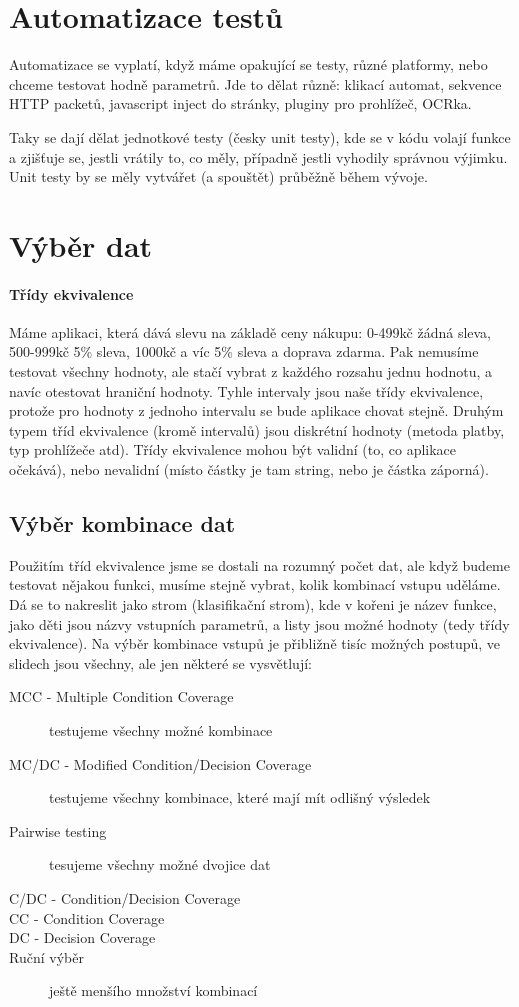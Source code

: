 \section{Automatizace testů}

Automatizace se vyplatí, když máme opakující se testy, různé platformy, nebo chceme testovat hodně parametrů. Jde to dělat různě: klikací automat, sekvence HTTP packetů, javascript inject do stránky, pluginy pro prohlížeč, OCRka.

Taky se dají dělat jednotkové testy (česky unit testy), kde se v kódu volají funkce a zjišťuje se, jestli vrátily to, co měly, případně jestli vyhodily správnou výjimku. Unit testy by se měly vytvářet (a spouštět) průběžně během vývoje.


\section{Výběr dat}

\paragraph{Třídy ekvivalence} Máme aplikaci, která dává slevu na základě ceny nákupu: 0-499kč žádná sleva, 500-999kč 5\% sleva, 1000kč a víc 5\% sleva a doprava zdarma. Pak nemusíme testovat všechny hodnoty, ale stačí vybrat z každého rozsahu jednu hodnotu, a navíc otestovat hraniční hodnoty. Tyhle intervaly jsou naše třídy ekvivalence, protože pro hodnoty z jednoho intervalu se bude aplikace chovat stejně. Druhým typem tříd ekvivalence (kromě intervalů) jsou diskrétní hodnoty (metoda platby, typ prohlížeče atd). Třídy ekvivalence mohou být validní (to, co aplikace očekává), nebo nevalidní (místo částky je tam string, nebo je částka záporná).

\subsection{Výběr kombinace dat} Použitím tříd ekvivalence jsme se dostali na rozumný počet dat, ale když budeme testovat nějakou funkci, musíme stejně vybrat, kolik kombinací vstupu uděláme. Dá se to nakreslit jako strom (klasifikační strom), kde v kořeni je název funkce, jako děti jsou názvy vstupních parametrů, a listy jsou možné hodnoty (tedy třídy ekvivalence). Na výběr kombinace vstupů je přibližně tisíc možných postupů, ve slidech jsou všechny, ale jen některé se vysvětlují:
\begin{description}
\item[MCC - Multiple Condition Coverage] testujeme všechny možné kombinace
\item[MC/DC - Modified Condition/Decision Coverage] testujeme všechny kombinace, které mají mít odlišný výsledek	
\item[Pairwise testing] tesujeme všechny možné dvojice dat
\item[C/DC - Condition/Decision Coverage]
\item[CC - Condition Coverage]
\item[DC - Decision Coverage]
\item[Ruční výběr] ještě menšího množství kombinací
\end{description}

